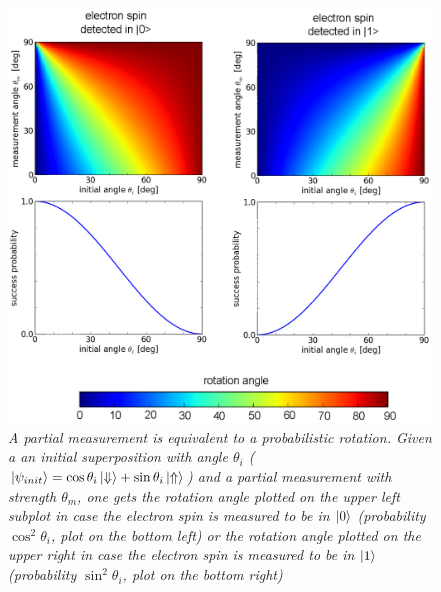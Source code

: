 \begin{figure} 
\centering
\includegraphics [width = 12 cm]{SOM/fig07_prob_rotation.eps}
\caption{\textit{A partial measurement is equivalent to a probabilistic rotation. Given a an initial superposition with angle $\theta_i$ ($\left|\psi_{init}\right> =  \cos\theta_i \left|\Downarrow\right>+ \sin\theta_i \left|\Uparrow\right> $) and a partial measurement with strength $\theta_m$, one gets the rotation angle plotted on the upper left subplot in case the electron spin is measured to be in $\left|0\right>$ (probability $\cos^2 \theta_i$, plot on the bottom left) or the rotation angle plotted on the upper right in case the electron spin is measured to be in $\left|1\right>$ (probability $\sin^2 \theta_i$, plot on the bottom right)}}
\label{fig:prob_rot}
\end{figure} 


